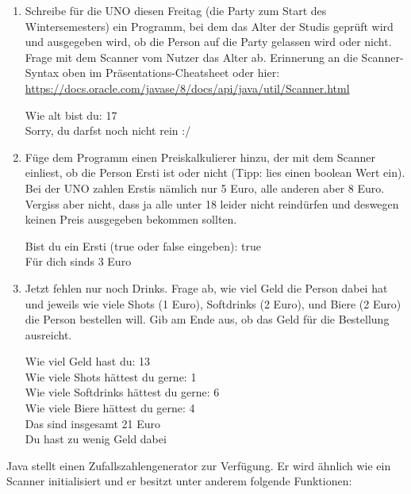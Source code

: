 \documentclass{../../sheet}
\begin{document}
\newpage
{}
\begin{enumerate}
	\item Schreibe für die UNO diesen Freitag (die Party zum Start des Wintersemesters) ein Programm, bei dem das Alter der Studis geprüft wird und ausgegeben wird, ob die Person auf die Party gelassen wird oder nicht. Frage mit dem Scanner vom Nutzer das Alter ab. Erinnerung an die Scanner-Syntax oben im Präsentations-Cheatsheet oder hier:\\ \url{https://docs.oracle.com/javase/8/docs/api/java/util/Scanner.html}
	      \begin{ausgabe}
		      Wie alt bist du: 17\\
		      Sorry, du darfst noch nicht rein :/
	      \end{ausgabe}
	\item Füge dem Programm einen Preiskalkulierer hinzu, der mit dem Scanner einliest, ob die Person Ersti ist oder nicht (Tipp: lies einen boolean Wert ein). Bei der UNO zahlen Erstis nämlich nur 5 Euro, alle anderen aber 8 Euro. Vergiss aber nicht, dass ja alle unter 18 leider nicht reindürfen und deswegen keinen Preis ausgegeben bekommen sollten.
	      \begin{ausgabe}
		      Bist du ein Ersti (true oder false eingeben): true\\
		      Für dich sinds 3 Euro
	      \end{ausgabe}
	\item Jetzt fehlen nur noch Drinks. Frage ab, wie viel Geld die Person dabei hat und jeweils wie viele Shots (1 Euro), Softdrinks (2 Euro), und Biere (2 Euro) die Person bestellen will. Gib am Ende aus, ob das Geld für die Bestellung ausreicht.
	      \begin{ausgabe}
		      Wie viel Geld hast du: 13\\
		      Wie viele Shots hättest du gerne: 1\\
		      Wie viele Softdrinks hättest du gerne: 6\\
		      Wie viele Biere hättest du gerne: 4\\
		      Das sind insgesamt 21 Euro\\
		      Du hast zu wenig Geld dabei
	      \end{ausgabe}
\end{enumerate}

\newpage
{}
Java stellt einen Zufallszahlengenerator zur Verfügung. Er wird ähnlich wie ein Scanner initialisiert und er besitzt unter anderem folgende Funktionen:
\end{document}
